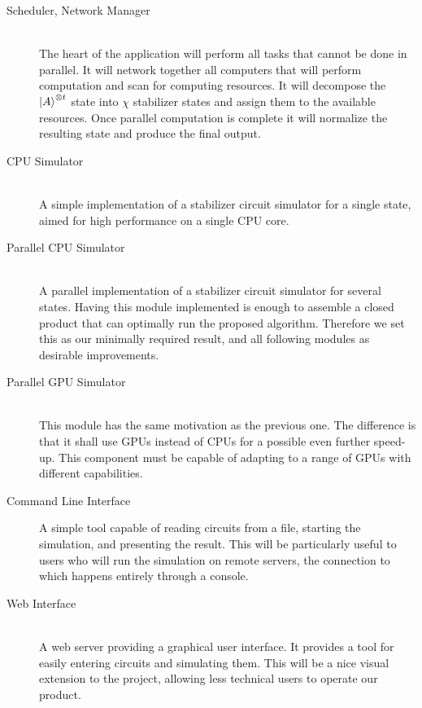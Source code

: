 \documentclass[11pt]{article}
\begin{document}
\begin{multicols}{2}
\begin{description}
    \item[Scheduler, Network Manager] \hfill \\
        The heart of the application will perform all tasks that cannot be done in parallel. It will network together all computers that will perform computation and scan for computing resources. It will decompose the ${\left\vert{A}\right\rangle}^{\otimes t}$ state into $\chi$ stabilizer states and assign them to the available resources. Once parallel computation is complete it will normalize the resulting state and produce the final output.
    \item[CPU Simulator] \hfill \\
        A simple implementation of a stabilizer circuit simulator for a single state, aimed for high performance on a single CPU core.
    \item[Parallel CPU Simulator] \hfill \\
        A parallel implementation of a stabilizer circuit simulator for several states. Having this module implemented is enough to assemble a closed product that can optimally run the proposed algorithm. Therefore we set this as our minimally required result, and all following modules as desirable improvements.
    \item[Parallel GPU Simulator] \hfill \\
        This module has the same motivation as the previous one. The difference is that it shall use GPUs instead of CPUs for a possible even further speed-up. This component must be capable of adapting to a range of GPUs with different capabilities.
    \item[Command Line Interface]
        A simple tool capable of reading circuits from a file, starting the simulation, and presenting the result. This will be particularly useful to users who will run the simulation on remote servers, the connection to which happens entirely through a console.
    \item[Web Interface] \hfill \\
        A web server providing a graphical user interface. It provides a tool for easily entering circuits and simulating them. This will be a nice visual extension to the project, allowing less technical users to operate our product.
\end{description}


\end{multicols}
\end{document}
